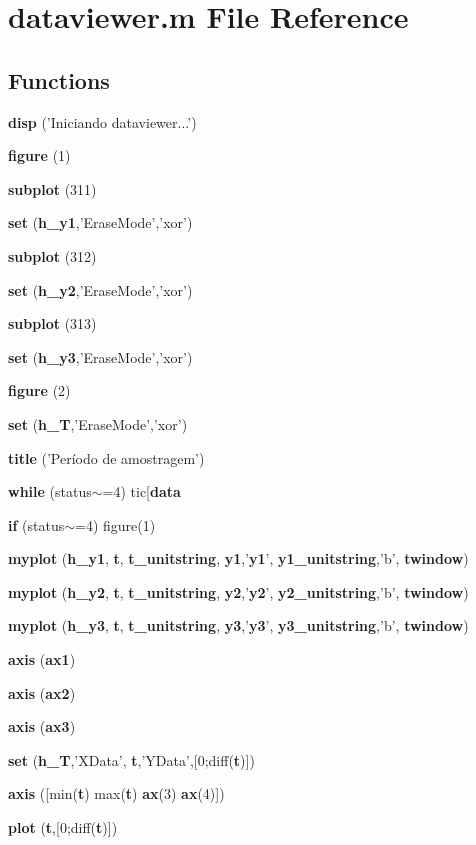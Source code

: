 \section{dataviewer.m File Reference}
\label{libs_2gdatalogger_2demo-pthread_2matlab_2dataviewer_8m}
\subsection*{Functions}
\begin{DoxyCompactItemize}
\item 
{\bf disp} ('Iniciando dataviewer...')
\item 
{\bf figure} (1)
\item 
{\bf subplot} (311)
\item 
{\bf set} ({\bf h\_\-y1},'EraseMode','xor')
\item 
{\bf subplot} (312)
\item 
{\bf set} ({\bf h\_\-y2},'EraseMode','xor')
\item 
{\bf subplot} (313)
\item 
{\bf set} ({\bf h\_\-y3},'EraseMode','xor')
\item 
{\bf figure} (2)
\item 
{\bf set} ({\bf h\_\-T},'EraseMode','xor')
\item 
{\bf title} ('Período de amostragem')
\item 
{\bf while} (status$\sim$=4) tic[{\bf data}
\item 
{\bf if} (status$\sim$=4) figure(1)
\item 
{\bf myplot} ({\bf h\_\-y1}, {\bf t}, {\bf t\_\-unitstring}, {\bf y1},'{\bf y1}', {\bf y1\_\-unitstring},'b', {\bf twindow})
\item 
{\bf myplot} ({\bf h\_\-y2}, {\bf t}, {\bf t\_\-unitstring}, {\bf y2},'{\bf y2}', {\bf y2\_\-unitstring},'b', {\bf twindow})
\item 
{\bf myplot} ({\bf h\_\-y3}, {\bf t}, {\bf t\_\-unitstring}, {\bf y3},'{\bf y3}', {\bf y3\_\-unitstring},'b', {\bf twindow})
\item 
{\bf axis} ({\bf ax1})
\item 
{\bf axis} ({\bf ax2})
\item 
{\bf axis} ({\bf ax3})
\item 
{\bf set} ({\bf h\_\-T},'XData', {\bf t},'YData',[0;diff({\bf t})])
\item 
{\bf axis} ([min({\bf t}) max({\bf t}) {\bf ax}(3) {\bf ax}(4)])
\item 
{\bf plot} ({\bf t},[0;diff({\bf t})])

\end{DoxyCompactItemize}
